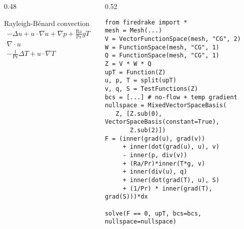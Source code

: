 \documentclass[presentation]{beamer}
\begin{document}
\begin{frame}[fragile]
  \begin{columns}
    \begin{column}{0.48\framewidth}
      \begin{block}{Rayleigh-B\'enard convection}
        \small
        \begin{equation*}
          \begin{split}
            -\Delta u + u\cdot\nabla u + \nabla p +
            \frac{\text{Ra}}{\text{Pr}} \hat{g}T &= 0 \\
            \nabla \cdot u &= 0 \\
            - \frac{1}{\text{Pr}} \Delta T + u\cdot \nabla T &= 0
          \end{split}
        \end{equation*}
      \end{block}
    \end{column}
    \begin{column}{0.52\framewidth}
\begin{verbatim}
from firedrake import *
mesh = Mesh(...)
V = VectorFunctionSpace(mesh, "CG", 2)
W = FunctionSpace(mesh, "CG", 1)
Q = FunctionSpace(mesh, "CG", 1)
Z = V * W * Q
upT = Function(Z)
u, p, T = split(upT)
v, q, S = TestFunctions(Z)
bcs = [...] # no-flow + temp gradient
nullspace = MixedVectorSpaceBasis(
   Z, [Z.sub(0), VectorSpaceBasis(constant=True), 
       Z.sub(2)])
F = (inner(grad(u), grad(v))
     + inner(dot(grad(u), u), v)
     - inner(p, div(v))
     + (Ra/Pr)*inner(T*g, v)
     + inner(div(u), q)
     + inner(dot(grad(T), u), S)
     + (1/Pr) * inner(grad(T), grad(S)))*dx

solve(F == 0, upT, bcs=bcs, nullspace=nullspace)
\end{verbatim}
    \end{column}
  \end{columns}
\end{frame}
\end{document}
